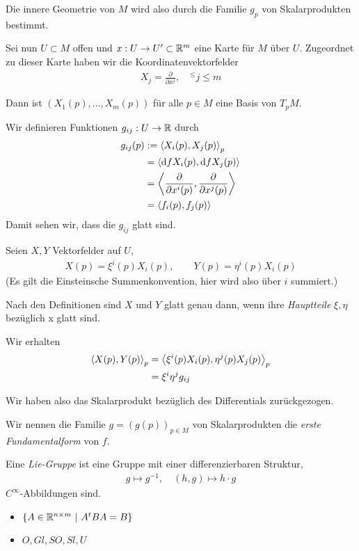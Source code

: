 \documentclass{skript}
\begin{document}
Die innere Geometrie von $M$ wird also durch die Familie $g_p$ von
Skalarprodukten bestimmt.


Sei nun $U\subset M$ offen und $x : U \to U' \subset \mathbb{R}^m$ eine Karte für $M$
über $U$. Zugeordnet zu dieser Karte haben wir die Koordinatenvektorfelder
\begin{align}
  X_j = \frac{\partial}{\partial x^j}, \quad ^\leq j \leq m
\end{align}

Dann ist $(X_1(p), \dots, X_m(p))$ für alle $p\in M$ eine Basis von $T_p M$.

Wir definieren Funktionen $g_{ij} : U\to \mathbb{R}$ durch
\begin{align}
  g_{ij}(p) &:= \sprod[p]{X_i(p), X_j(p)} \\
            &= \sprod{\d f X_i(p), \d f X_j(p)} \\
            &= \sprod{\frac{\partial}{\partial x^i(p)},
            \frac{\partial}{\partial x^j(p)}} \\
            &= \sprod{f_i(p), f_j(p)}
\end{align}
Damit sehen wir, dass die $g_{ij}$ glatt sind.

Seien $X,Y$ Vektorfelder auf $U$,
\begin{align}
  X(p) = \xi^i(p)X_i(p), \qquad Y(p) = \eta^i(p)X_i(p)
\end{align} (Es gilt die Einsteinsche Summenkonvention, hier wird also über $i$
summiert.)

Nach den Definitionen sind $X$ und $Y$ glatt genau dann, wenn ihre
\emph{Hauptteile} $\xi, \eta$ bezüglich x glatt sind.

Wir erhalten
\begin{align}
  \sprod[p]{X(p), Y(p)} &= \sprod[p]{\xi^i(p)X_i(p), \eta^j(p)X_j(p)} \\
                        &= \xi^i\eta^jg_{ij}
\end{align}

Wir haben also das Skalarprodukt bezüglich des Differentials zurückgezogen.

Wir nennen die Familie $g = (g(p))_{p\in M}$ von Skalarprodukten die \emph{erste
Fundamentalform} von $f$.


\begin{dfn}
  Eine \emph{Lie-Gruppe} ist eine Gruppe mit einer differenzierbaren Struktur,
  \begin{align}
    g\mapsto g^{-1}, \quad (h,g)\mapsto h\cdot g
  \end{align}
  $C^\infty$-Abbildungen sind.

  \begin{bsps}
    \begin{itemize}
      \item $\mdef[A\in \R^{n\times m}]{A^tBA=B}$
      \item $O, Gl, SO, Sl, U$
    \end{itemize}
  \end{bsps}
\end{dfn}
\end{document}
